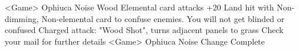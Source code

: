 <Game> Ophiuca Noise 
Wood Elemental card attacks +20 
Land hit with Non-dimming, Non-elemental card to confuse enemies. You will 
not get blinded or confused 
Charged attack: "Wood Shot", turns adjacent panels to grass 
Check your mail for further details 
<Game> Ophiuca Noise Change Complete 
